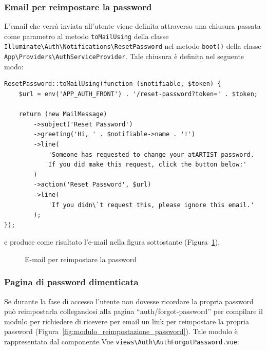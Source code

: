 \subsubsection{Email per reimpostare la password}
L'email che verr\`a inviata all'utente viene definita attraverso una chiusura passata come parametro al metodo \verb|toMailUsing| della classe \verb|Illuminate\Auth\Notifications\ResetPassword| nel metodo \verb|boot()| della classe \verb|App\Providers\AuthServiceProvider|. Tale chiusura \`e definita nel seguente modo:
\begin{lstlisting}[caption={E-mail per reimpostare la password}, label={lst:route_registration}]
ResetPassword::toMailUsing(function ($notifiable, $token) {
	$url = env('APP_AUTH_FRONT') . '/reset-password?token=' . $token;
	
	return (new MailMessage)
		->subject('Reset Password')
		->greeting('Hi, ' . $notifiable->name . '!')
		->line(
			'Someone has requested to change your atARTIST password.
			If you did make this request, click the button below:'
		)
		->action('Reset Password', $url)
		->line(
			'If you didn\`t request this, please ignore this email.'
		);
});
\end{lstlisting}
e produce come risultato l'e-mail nella figura sottostante (Figura~\ref{fig:email_di_psw_reset}).
\begin{figure}[htbp]
	\centering
	\fboxsep=0.5pt
	\fboxrule=0.5pt
	\caption{E-mail per reimpostare la password}
	\label{fig:email_di_psw_reset}
\end{figure}

\subsubsection{Pagina di password dimenticata}
Se durante la fase di accesso l'utente non dovesse ricordare la propria password pu\`o reimpostarla collegandosi alla pagina ``auth/forgot-password'' per compilare il modulo per richiedere di ricevere per email un link per reimpostare la propria password  (Figura~\ref{fig:modulo_reimpostazione_password}). Tale modulo \`e rappresentato dal componente Vue \verb|views\Auth\AuthForgotPassword.vue|:

